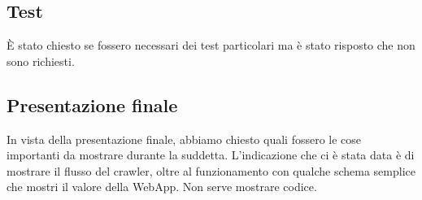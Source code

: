 \subsection{Test}
È stato chiesto se fossero necessari dei test particolari ma è stato risposto che non sono richiesti.

\subsection{Presentazione finale}
In vista della presentazione finale, abbiamo chiesto quali fossero le cose importanti da mostrare durante la suddetta. L'indicazione che ci è stata data è di mostrare il flusso del crawler, oltre al funzionamento con qualche schema semplice che mostri il valore della WebApp. Non serve mostrare codice. 

\pagebreak
